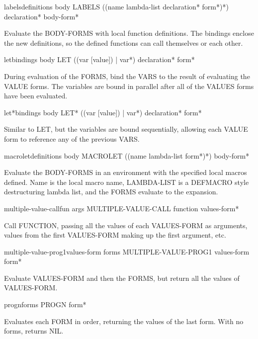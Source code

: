 \documentclass[10pt,english]{book}
\begin{document}
\begin{specialop}{labels}{definitions \body body}
  LABELS ({(name lambda-list declaration* form*)}*) declaration* body-form*

Evaluate the BODY-FORMS with local function definitions. The bindings enclose
the new definitions, so the defined functions can call themselves or each
other.
\end{specialop}

\begin{specialop}{let}{bindings \body body}
  LET ({(var [value]) | var}*) declaration* form*

During evaluation of the FORMS, bind the VARS to the result of evaluating the
VALUE forms. The variables are bound in parallel after all of the VALUES forms
have been evaluated.
\end{specialop}

\begin{specialop}{let*}{bindings \body body}
  LET* ({(var [value]) | var}*) declaration* form*

Similar to LET, but the variables are bound sequentially, allowing each VALUE
form to reference any of the previous VARS.
\end{specialop}

\begin{specialop}{macrolet}{definitions \rest body}
  MACROLET ({(name lambda-list form*)}*) body-form*

Evaluate the BODY-FORMS in an environment with the specified local macros
defined. Name is the local macro name, LAMBDA-LIST is a DEFMACRO style
destructuring lambda list, and the FORMS evaluate to the expansion.
\end{specialop}

\begin{specialop}{multiple-value-call}{fun \rest args}
  MULTIPLE-VALUE-CALL function values-form*

Call FUNCTION, passing all the values of each VALUES-FORM as arguments,
values from the first VALUES-FORM making up the first argument, etc.
\end{specialop}

\begin{specialop}{multiple-value-prog1}{values-form \rest forms}
  MULTIPLE-VALUE-PROG1 values-form form*

Evaluate VALUES-FORM and then the FORMS, but return all the values of
VALUES-FORM.
\end{specialop}

\begin{specialop}{progn}{\rest forms}
  PROGN form*

Evaluates each FORM in order, returning the values of the last form. With no
forms, returns NIL.
\end{specialop}
\end{document}
